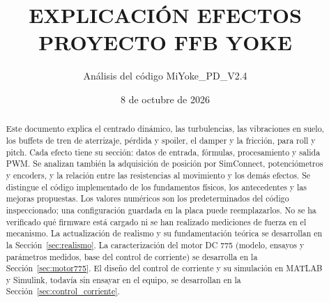 \documentclass[11pt,a4paper]{article}
\title{EXPLICACIÓN EFECTOS PROYECTO FFB YOKE}
\author{Análisis del código MiYoke\_PD\_V2.4}
\date{8 de octubre de 2026}
\begin{document}
\maketitle
\begin{abstract}
Este documento explica el centrado dinámico, las turbulencias, las vibraciones en suelo, los buffets de tren de aterrizaje, pérdida y spoiler, el damper y la fricción, para roll y pitch. Cada efecto tiene su sección: datos de entrada, fórmulas, procesamiento y salida PWM. Se analizan también la adquisición de posición por SimConnect, potenciómetros y encoders, y la relación entre las resistencias al movimiento y los demás efectos. Se distingue el código implementado de los fundamentos físicos, los antecedentes y las mejoras propuestas. Los valores numéricos son los predeterminados del código inspeccionado; una configuración guardada en la placa puede reemplazarlos. No se ha verificado qué firmware está cargado ni se han realizado mediciones de fuerza en el mecanismo.
La actualización de realismo y su fundamentación teórica se desarrollan en la Sección~\ref{sec:realismo}.
La caracterización del motor DC 775 (modelo, ensayos y parámetros medidos, base del control de corriente) se desarrolla en la Sección~\ref{sec:motor775}. El diseño del control de corriente y su simulación en MATLAB y Simulink, todavía sin ensayar en el equipo, se desarrollan en la Sección~\ref{sec:control_corriente}.
\end{abstract}
\tableofcontents
\newpage















\end{document}

